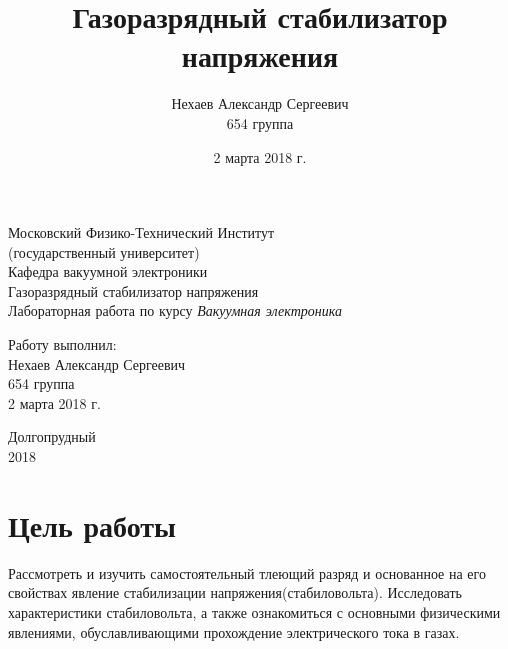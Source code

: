 \documentclass[a4paper, 12pt]{article}
\author{Нехаев Александр Сергеевич\\654 группа}
\title{Газоразрядный стабилизатор напряжения}
\date{2 марта 2018 г.}
\begin{document}
\begin{titlepage}
\begin{center}
Московский Физико-Технический Институт\\
(государственный университет)\\
\vspace{0.5cm}
Кафедра вакуумной электроники\\
\vspace{1.5cm}
\huge
Газоразрядный стабилизатор напряжения\\
\vspace{0.5cm}
\small
Лабораторная работа по курсу \textit{Вакуумная электроника}\\
\vspace{5cm}
\end{center}
\begin{flushright}
Работу выполнил:\\
Нехаев Александр Сергеевич\\
654 группа\\
2 марта 2018 г.
\end{flushright}
\begin{center}
\vspace{5.7 cm}
Долгопрудный\\
2018
\end{center}
\end{titlepage}
\newpage
\tableofcontents
{}
\newpage
\section{Цель работы}
Рассмотреть и изучить самостоятельный тлеющий разряд и основанное на его свойствах явление стабилизации напряжения(стабиловольта). Исследовать характеристики стабиловольта, а также ознакомиться с основными физическими явлениями, обуславливающими прохождение электрического тока в газах.
\end{document}

